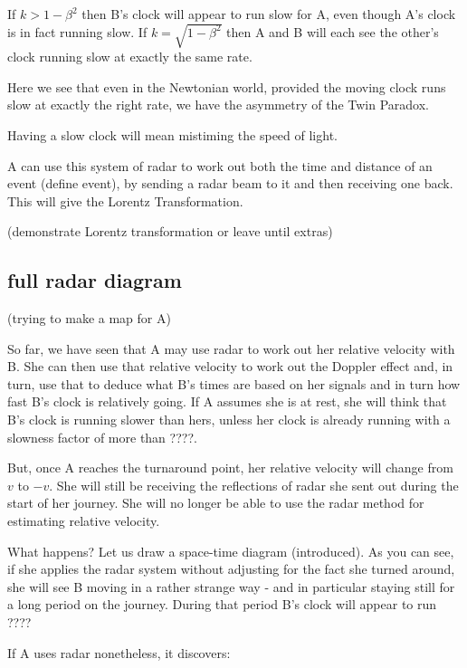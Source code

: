 \documentclass[a4paper]{report}
\begin{document}
If $k > 1 - \beta^2$ then B's clock will appear to run slow for A, even though A's clock is in fact running slow. If $k = \sqrt{1 - \beta^2}$ then A and B will each see the other's clock running slow at exactly the same rate.

Here we see that even in the Newtonian world, provided the moving clock runs slow at exactly the right rate, we have the asymmetry of the Twin Paradox.

Having a slow clock will mean mistiming the speed of light.


A can use this system of radar to work out both the time and distance of an event (define event), by sending a radar beam to it and then receiving one back. This will give the Lorentz Transformation.

(demonstrate Lorentz transformation or leave until extras)
\subsection*{full radar diagram}
(trying to make a map for A)

So far, we have seen that A may use radar to work out her relative velocity with B. She can then use that relative velocity to work out the Doppler effect and, in turn, use that to deduce what B's times are based on her signals and in turn how fast B's clock is relatively going. If A assumes she is at rest, she will think that B's clock is running slower than hers, unless her clock is already running with a slowness factor of more than ????.

But, once A reaches the turnaround point, her relative velocity will change from $v$ to $-v$. She will still be receiving the reflections of radar she sent out during the start of her journey. She will no longer be able to use the radar method for estimating relative velocity.

What happens? Let us draw a space-time diagram (introduced). As you can see, if she applies the radar system without adjusting for the fact she turned around, she will see B moving in a rather strange way - and in particular staying still for a long period on the journey. During that period B's clock will appear to run ???? 

If A uses radar nonetheless, it discovers:
\end{document}
